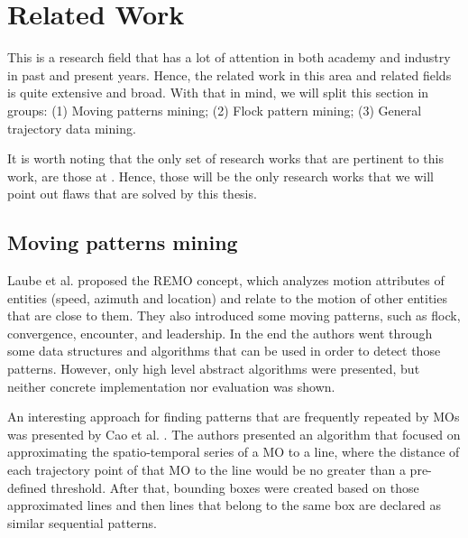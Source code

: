 \chapter{Related Work}
\label{chp:relatedwork}
This is a research field that has a lot of attention in both academy and industry in past and present years. Hence, the
related work in this area and related fields is quite extensive and broad. With that in mind, we will split this section
in groups: (1) Moving patterns mining; (2) Flock pattern mining; (3) General trajectory data mining.

It is worth noting that the only set of research works that are pertinent to this work, are those at
. Hence, those will be the only research works that we will point out flaws that are solved by
this thesis.

\section{Moving patterns mining}
\label{sec:rel_moving}
Laube et al. \citep{remo} proposed the REMO concept, which analyzes motion attributes of entities
(speed, azimuth and location) and relate to the motion of other entities that are close to them. They also introduced
some moving patterns, such as flock, convergence, encounter, and leadership. In the end the authors went through some
data structures and algorithms that can be used in order to detect those patterns. However, only high level abstract
algorithms were presented, but neither concrete implementation nor evaluation was shown.

An interesting approach for finding patterns that are frequently repeated by MOs was presented by Cao et al.
\citep{frequentpatterns}. The authors presented an algorithm that focused on approximating the spatio-temporal series
of a MO to a line, where the distance of each trajectory point of that MO to the line would be no greater than a
pre-defined threshold. After that, bounding boxes were created based on those approximated lines and then lines that
belong to the same box are declared as similar sequential patterns.


